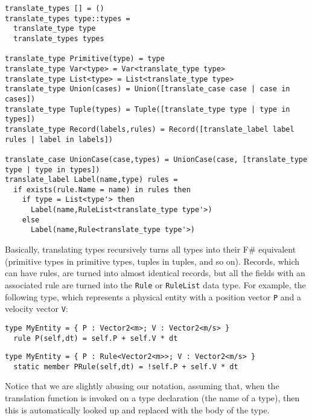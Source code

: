 \begin{lstlisting}
translate_types [] = ()
translate_types type::types = 
  translate_type type
  translate_types types

translate_type Primitive(type) = type
translate_type Var<type> = Var<translate_type type>
translate_type List<type> = List<translate_type type>
translate_type Union(cases) = Union([translate_case case | case in cases])
translate_type Tuple(types) = Tuple([translate_type type | type in types])
translate_type Record(labels,rules) = Record([translate_label label rules | label in labels])

translate_case UnionCase(case,types) = UnionCase(case, [translate_type type | type in types])
translate_label Label(name,type) rules = 
  if exists(rule.Name = name) in rules then
    if type = List<type'> then
      Label(name,RuleList<translate_type type'>)
    else
      Label(name,Rule<translate_type type'>)
\end{lstlisting}

Basically, translating types recursively turns all types into their F\# equivalent (primitive types in primitive types, tuples in tuples, and so on). Records, which can have rules, are turned into almost identical records, but all the fields with an associated rule are turned into the \texttt{Rule} or \texttt{RuleList} data type. For example, the following type, which represents a physical entity with a position vector \texttt{P} and a velocity vector \texttt{V}:

\begin{lstlisting}
type MyEntity = { P : Vector2<m>; V : Vector2<m/s> }
  rule P(self,dt) = self.P + self.V * dt
\end{lstlisting}


\begin{lstlisting}
type MyEntity = { P : Rule<Vector2<m>>; V : Vector2<m/s> }
  static member PRule(self,dt) = !self.P + self.V * dt
\end{lstlisting}

Notice that we are slightly abusing our notation, assuming that, when the translation function is invoked on a type declaration (the name of a type), then this is automatically looked up and replaced with the body of the type.


